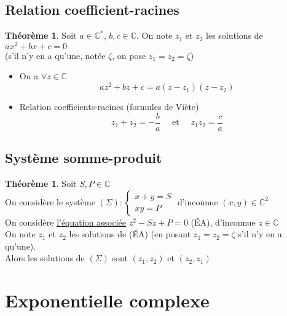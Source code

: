 \documentclass[10pt,a4paper]{article}
\theoremstyle{definition}
\newtheorem{theorem}[proposition]{Théorème}
\begin{document}
\subsection{Relation coefficient-racines}
\begin{theorem}
Soit $a \in \mathbb{C}^*$, $b, c \in \mathbb{C}$. On note $z_1$ et $z_2$ les solutions de $ax^2 + bx + c = 0$ \\
(s'il n'y en a qu'une, notée $\zeta$, on pose $z_1 = z_2 = \zeta$)
\begin{itemize}
\item On a $\forall z \in \mathbb{C}$
\[az^2 + bz + c = a(z - z_1)(z - z_2)\]
\item Relation coefficients-racines (formules de Viète)
\[z_1 + z_2 = -\frac{b}{a} \quad \text{ et } \quad z_1 z_2 = \frac{c}{a}\]
\end{itemize}
\end{theorem}

\subsection{Système somme-produit}
\begin{theorem}
Soit $S, P \in \mathbb{C}$ \\
On considère le système $(\Sigma): \begin{cases}
x + y = S \\
xy = P
\end{cases}$ d'inconnue $(x, y) \in \mathbb{C}^2$ \\
On considère \uline{l'équation associée} $z^2 - Sz + P = 0$ (ÉA), d'inconnue $z \in \mathbb{C}$ \\
On note $z_1$ et $z_2$ les solutions de (ÉA) (en posant $z_1 = z_2 = \zeta$ s'il n'y en a qu'une). \\
Alors les solutions de $(\Sigma)$ sont $(z_1, z_2)$ et $(z_2, z_1)$
\end{theorem}

\section{Exponentielle complexe}
\end{document}

